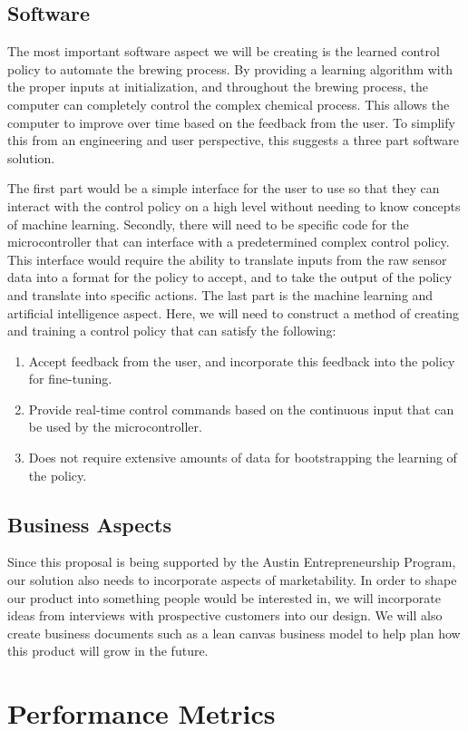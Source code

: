 \documentclass[letterpaper,10pt]{article}
\begin{document}
\subsection{Software}
The most important software aspect we will be creating is the learned control policy 
to automate the brewing process. By providing a learning algorithm with the proper 
inputs at initialization, and throughout the brewing process, the computer can completely 
control the complex chemical process. This allows the computer to improve over time 
based on the feedback from the user. To simplify this from an engineering and user 
perspective, this suggests a three part software solution.

The first part would be a simple interface for the user to use so that they can 
interact with the control policy on a high level without needing to know concepts of 
machine learning. Secondly, there will need to be specific code for the microcontroller 
that can interface with a predetermined complex control policy. This interface would 
require the ability to translate inputs from the raw sensor data into a format for 
the policy to accept, and to take the  output of the policy and translate into specific 
actions. The last part is the machine learning and artificial intelligence aspect.
Here, we will need to construct a method of creating and training a control policy 
that can satisfy the following:

\begin{enumerate}
	\item Accept feedback from the user, and incorporate this feedback into the 
		policy for fine-tuning.
	\item Provide real-time control commands based on the continuous input that 
		can be used by the microcontroller.
	\item Does not require extensive amounts of data for bootstrapping the learning 
		of the policy.
\end{enumerate}

\subsection{Business Aspects}
Since this proposal is being supported by the Austin Entrepreneurship Program, our 
solution also needs to incorporate aspects of marketability. In order to shape our 
product into something people would be interested in, we will incorporate ideas 
from interviews with prospective customers into our design. We will also create 
business documents such as a lean canvas business model to help plan how this product 
will grow in the future.
\section{Performance Metrics}
\end{document}
